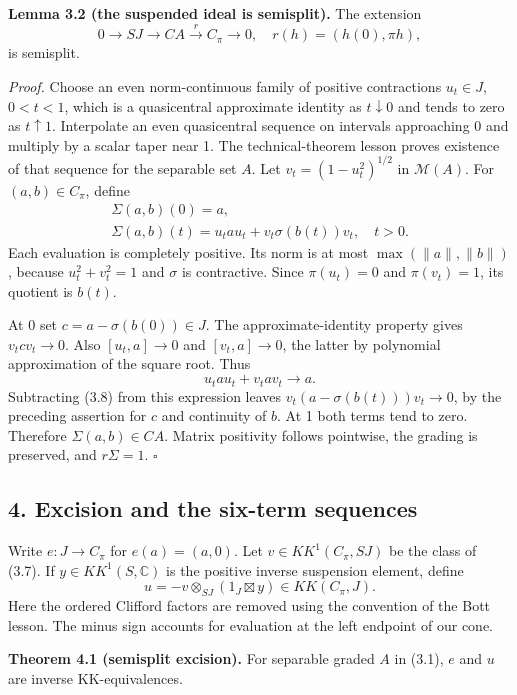 \documentclass[
  11pt,
]{article}
\begin{document}
\textbf{Lemma 3.2 (the suspended ideal is semisplit).} The extension \[
0\longrightarrow SJ\longrightarrow CA
\xrightarrow{r}C_\pi\longrightarrow0,
\quad r(h)=(h(0),\pi h),
\tag{3.7}
\] is semisplit.

\emph{Proof.} Choose an even norm-continuous family of positive
contractions \(u_t\in J\), \(0<t<1\), which is a quasicentral
approximate identity as \(t\downarrow0\) and tends to zero as
\(t\uparrow1\). Interpolate an even quasicentral sequence on intervals
approaching 0 and multiply by a scalar taper near 1. The
technical-theorem lesson proves existence of that sequence for the
separable set \(A\). Let \(v_t=(1-u_t^2)^{1/2}\) in \(\mathcal M(A)\).
For \((a,b)\in C_\pi\), define \[
\begin{gathered}
\Sigma(a,b)(0)=a,\\
\Sigma(a,b)(t)=u_t a u_t+v_t\sigma(b(t))v_t,\quad t>0.
\end{gathered}
\tag{3.8}
\] Each evaluation is completely positive. Its norm is at most
\(\max(\|a\|,\|b\|)\), because \(u_t^2+v_t^2=1\) and \(\sigma\) is
contractive. Since \(\pi(u_t)=0\) and \(\pi(v_t)=1\), its quotient is
\(b(t)\).

At 0 set \(c=a-\sigma(b(0))\in J\). The approximate-identity property
gives \(v_tcv_t\to0\). Also \([u_t,a]\to0\) and \([v_t,a]\to0\), the
latter by polynomial approximation of the square root. Thus \[
u_t a u_t+v_t a v_t\longrightarrow a.
\tag{3.9}
\] Subtracting (3.8) from this expression leaves
\(v_t(a-\sigma(b(t)))v_t\to0\), by the preceding assertion for \(c\) and
continuity of \(b\). At 1 both terms tend to zero. Therefore
\(\Sigma(a,b)\in CA\). Matrix positivity follows pointwise, the grading
is preserved, and \(r\Sigma=1\). \(\square\)

\subsection{4. Excision and the six-term
sequences}\label{excision-and-the-six-term-sequences}

Write \(e:J\to C_\pi\) for \(e(a)=(a,0)\). Let \(v\in KK^1(C_\pi,SJ)\)
be the class of (3.7). If \(y\in KK^1(S,\mathbb C)\) is the positive
inverse suspension element, define \[
u=-v\otimes_{SJ}(1_J\boxtimes y)
\in KK(C_\pi,J).
\tag{4.1}
\] Here the ordered Clifford factors are removed using the convention of
the Bott lesson. The minus sign accounts for evaluation at the left
endpoint of our cone.

\textbf{Theorem 4.1 (semisplit excision).} For separable graded \(A\) in
(3.1), \(e\) and \(u\) are inverse KK-equivalences.
\end{document}
